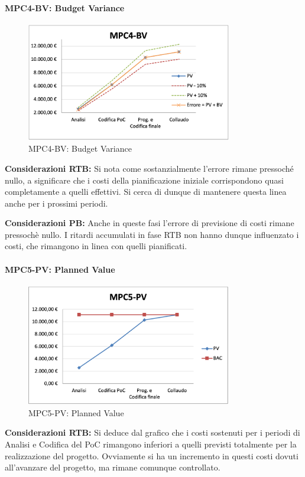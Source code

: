 \paragraph{MPC4-BV: Budget Variance}
\begin{figure}[h!] 
    \centering
    \includegraphics[width=0.8\textwidth]{images/MPC4-BV.png}
    \caption{MPC4-BV: Budget Variance}
\end{figure}
\noindent \textbf{Considerazioni RTB:} Si nota come sostanzialmente l'errore rimane pressoché nullo, a significare che i costi della pianificazione iniziale corrispondono quasi completamente a quelli effettivi. Si cerca di dunque di mantenere questa linea anche per i prossimi periodi.

\vspace{0.5cm}
\noindent \textbf{Considerazioni PB:} Anche in queste fasi l'errore di previsione di costi rimane pressochè nullo. I ritardi accumulati in fase RTB non hanno dunque influenzato i costi, che rimangono in linea con quelli pianificati.

\paragraph{MPC5-PV: Planned Value}
\begin{figure}[H]
    \centering
    \includegraphics[width=0.8\textwidth]{images/MPC5-PV.png}
    \caption{MPC5-PV: Planned Value}
\end{figure}
\noindent \textbf{Considerazioni RTB:} Si deduce dal grafico che i costi sostenuti per i periodi di Analisi e Codifica del PoC rimangono inferiori a quelli previsti totalmente per la realizzazione del progetto. Ovviamente si ha un incremento in questi costi dovuti all'avanzare del progetto, ma rimane comunque controllato.

